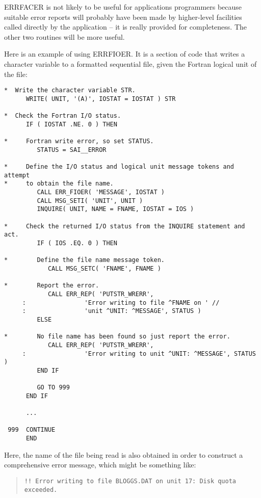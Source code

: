 \documentclass[twoside,11pt]{article}
\renewcommand{\_}{\texttt{\symbol{95}}}
\begin{document}
ERR\_FACER is not likely to be useful for applications programmers because
suitable error reports will probably have been made by higher-level facilities
called directly by the application -- it is really provided for completeness.
The other two routines will be more useful.

Here is an example of using ERR\_FIOER.
It is a section of code that writes a character variable to a formatted
sequential file, given the Fortran logical unit of the file:

\begin {small}
\begin{verbatim}
*  Write the character variable STR.
      WRITE( UNIT, '(A)', IOSTAT = IOSTAT ) STR

*  Check the Fortran I/O status.
      IF ( IOSTAT .NE. 0 ) THEN

*     Fortran write error, so set STATUS.
         STATUS = SAI__ERROR

*     Define the I/O status and logical unit message tokens and attempt
*     to obtain the file name.
         CALL ERR_FIOER( 'MESSAGE', IOSTAT )
         CALL MSG_SETI( 'UNIT', UNIT )
         INQUIRE( UNIT, NAME = FNAME, IOSTAT = IOS )

*     Check the returned I/O status from the INQUIRE statement and act.
         IF ( IOS .EQ. 0 ) THEN

*        Define the file name message token.
            CALL MSG_SETC( 'FNAME', FNAME )

*        Report the error.
            CALL ERR_REP( 'PUTSTR_WRERR',
     :                'Error writing to file ^FNAME on ' //
     :                'unit ^UNIT: ^MESSAGE', STATUS )
         ELSE

*        No file name has been found so just report the error.
            CALL ERR_REP( 'PUTSTR_WRERR',
     :                'Error writing to unit ^UNIT: ^MESSAGE', STATUS )
         END IF

         GO TO 999
      END IF

      ...

 999  CONTINUE
      END
\end{verbatim}
\end {small}

Here, the name of the file being read is also obtained in order to construct
a comprehensive error message, which might be something like:

\begin {quote}
\begin {small}
\begin{verbatim}
!! Error writing to file BLOGGS.DAT on unit 17: Disk quota exceeded.
\end{verbatim}
\end {small}
\end {quote}
\end{document}
